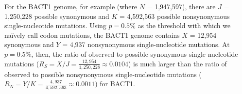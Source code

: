 For the BACT1 genome, for example
(where $N$ = 1,947,597),
there are $J$ = 1,250,228 possible synonymous and
$K$ = 4,592,563 possible nonsynonymous single-nucleotide mutations.
%
Using $p = 0.5\%$ as the threshold with which we na\"ively call codon mutations,
the BACT1 genome contains
$X$ = 12,954 synonymous and
$Y$ = 4,937 nonsynonymous single-nucleotide mutations.
%
At $p = 0.5\%$, then, the ratio of observed to possible synonymous single-nucleotide mutations
($R_S = X / J = \frac{12,954}{1,250,228}
\approx 0.0104$)
is much larger than the ratio of observed to possible nonsynonymous single-nucleotide mutations
($R_N = Y / K = \frac{4,937}{4,592,563}
\approx 0.0011$)
for BACT1.
\endinput